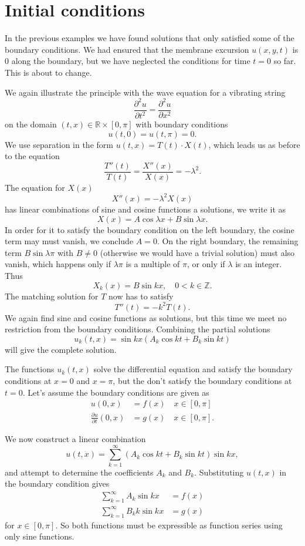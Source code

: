 %
%
%
\section{Initial conditions}
In the previous examples we have found solutions that only satisfied
some of the boundary conditions.
We had ensured that the membrane excursion $u(x,y,t)$ is $0$ along the
boundary, but we have neglected the conditions for time $t=0$ so far.
This is about to change.

We again illustrate the principle with the wave equation
for a vibrating string
\[
\frac{\partial^2 u}{\partial t^2}=\frac{\partial^2 u}{\partial x^2}
\]
on the domain
$(t,x)\in\mathbb R\times [0,\pi] $
with boundary conditions
\[
u(t,0)=u(t,\pi)=0.
\]
We use separation in the form
$u(t,x)=T(t)\cdot X(t)$,
which leads us as before to the equation
\[
\frac{T''(t)}{T(t)}=\frac{X''(x)}{X(x)}=-\lambda^2.
\]
The equation for $X(x)$
\[
X''(x)=-\lambda^2 X(x)
\]
has linear combinations of sine and cosine functions a solutions,
we write it as
\[
X(x)=A\cos\lambda x+B\sin\lambda x.
\]
In order for it to satisfy the boundary condition on the left boundary,
the cosine term may must vanish, we conclude $A=0$.
On the right boundary, the remaining term $B\sin\lambda \pi$ with $B\ne 0$
(otherwise we would have a trivial solution) must also vanish, 
which happens only if $\lambda\pi$ is a multiple of $\pi$, or only if
$\lambda$ is an integer.
Thus
\[
X_k(x)=B\sin kx, \quad 0<k\in\mathbb Z.
\]
The matching solution for $T$ now has to satisfy 
\[
T''(t)=-k^2T(t).
\]
We again find sine and cosine functions as solutions, but this time
we meet no restriction from the boundary conditions.
Combining the partial solutions 
\[
u_k(t,x)=\sin kx\left(A_k\cos kt+B_k\sin kt\right)
\]
will give the complete solution.

The functions $u_k(t,x)$ solve the differential equation and satisfy
the boundary conditions at $x=0$ and $x=\pi$, but the don't satisfy 
the boundary conditions at $t=0$.
Let's assume the boundary conditions are given as
\begin{align*}
u(0,x)&=f(x)\quad x\in[0,\pi]\\
\frac{\partial u}{\partial t}(0,x)&=g(x)\quad x\in[0,\pi].
\end{align*}

We now construct a linear combination
\[
u(t,x)=\sum_{k=1}^{\infty}
\left(A_k\cos kt+B_k\sin kt\right)
\sin kx,
\]
and attempt to determine the coefficients $A_k$ and $B_k$.
Substituting $u(t,x)$ in the boundary condition gives
\begin{align*}
\sum_{k=1}^{\infty}
A_k \sin kx
&=f(x)
\\
\sum_{k=1}^{\infty}
B_kk\sin kx
&=g(x)
\end{align*}
for $x\in[0,\pi]$.
So both functions must be expressible as function series using only 
sine functions.

